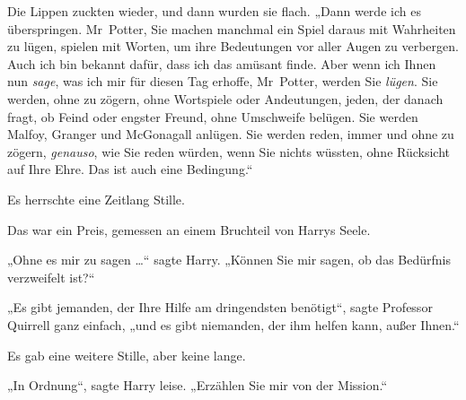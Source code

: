 Die Lippen zuckten wieder, und dann wurden sie flach.
„Dann werde ich es überspringen. Mr~Potter, Sie machen manchmal ein Spiel daraus mit Wahrheiten zu lügen, spielen mit Worten, um ihre Bedeutungen vor aller Augen zu verbergen. Auch ich bin bekannt dafür, dass ich das amüsant finde. Aber wenn ich Ihnen nun \emph{sage}, was ich mir für diesen Tag erhoffe, Mr~Potter, werden Sie \emph{lügen}. Sie werden, ohne zu zögern, ohne Wortspiele oder Andeutungen, jeden, der danach fragt, ob Feind oder engster Freund, ohne Umschweife belügen. Sie werden Malfoy, Granger und McGonagall anlügen. Sie werden reden, immer und ohne zu zögern, \emph{genauso}, wie Sie reden würden, wenn Sie nichts wüssten, ohne Rücksicht auf Ihre Ehre. Das ist auch eine Bedingung.“

Es herrschte eine Zeitlang Stille.

Das war ein Preis, gemessen an einem Bruchteil von Harrys Seele.

„Ohne es mir zu sagen …“ sagte Harry.
„Können Sie mir sagen, ob das Bedürfnis verzweifelt ist?“

„Es gibt jemanden, der Ihre Hilfe am dringendsten benötigt“, sagte Professor Quirrell ganz einfach, „und es gibt niemanden, der ihm helfen kann, außer Ihnen.“

Es gab eine weitere Stille, aber keine lange.

„In Ordnung“, sagte Harry leise.
„Erzählen Sie mir von der Mission.“

